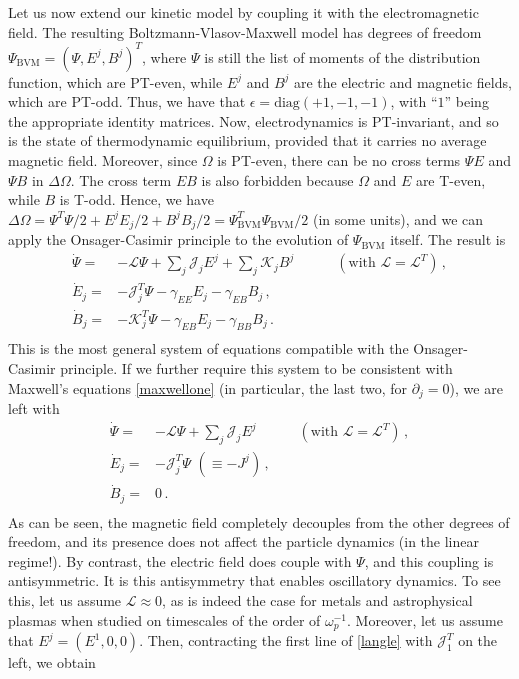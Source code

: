 \documentclass[a4paper, amsfonts, amssymb, amsmath, reprint, showkeys, nofootinbib, twoside,notitlepage,onecolumn]{revtex4-1}
\newcommand{\spc}{\quad \quad \quad}
\theoremstyle{definition}
\theoremstyle{theorem}
\begin{document}
Let us now extend our kinetic model by coupling it with the electromagnetic field. The resulting Boltzmann-Vlasov-Maxwell model has degrees of freedom $\Psi_{\text{BVM}}=(\Psi,E^j,B^j)^T$, where $\Psi$ is still the list of moments of the distribution function, which are PT-even, while $E^j$ and $B^j$ are the electric and magnetic fields, which are PT-odd. Thus, we have that $\epsilon=\text{diag}(+1,-1,-1)$, with ``$1$'' being the appropriate identity matrices. Now, electrodynamics is PT-invariant, and so is the state of thermodynamic equilibrium, provided that it carries no average magnetic field. Moreover, since $\Omega$ is PT-even, there can be no cross terms $\Psi E$ and $\Psi B$ in $\Delta \Omega$. The cross term $EB$ is also forbidden because $\Omega$ and $E$ are T-even, while $B$ is T-odd. Hence, we have $\Delta\Omega=\Psi^T \Psi/2+E^j E_j/2+B^j B_j/2=\Psi^T_{\text{BVM}}\Psi_{\text{BVM}}/2$ (in some units), and we can apply the Onsager-Casimir principle to the evolution of $\Psi_{\text{BVM}}$ itself. The result is
\newpage
\begin{equation}
\begin{split}
\Dot{\Psi}={}& -\mathcal{L}\Psi +{\sum}_j\mathcal{J}_j E^j +{\sum}_j \mathcal{K}_j B^j \spc (\text{with }\mathcal{L}=\mathcal{L}^T)\, , \\
\Dot{E}_j ={}&-\mathcal{J}_j^T\Psi -\gamma_{EE} E_j -\gamma_{EB}B_j \, , \\
\Dot{B}_j ={}&-\mathcal{K}_j^T\Psi -\gamma_{EB} E_j -\gamma_{BB}B_j \, . \\
\end{split}
\end{equation}
This is the most general system of equations compatible with the Onsager-Casimir principle. If we further require this system to be consistent with Maxwell's equations \eqref{maxwellone} (in particular, the last two, for $\partial_j=0$), we are left with
\begin{equation}\label{langle}
\begin{split}
\Dot{\Psi}={}& -\mathcal{L}\Psi +{\sum}_j\mathcal{J}_j E^j\spc (\text{with }\mathcal{L}=\mathcal{L}^T)\, , \\
\Dot{E}_j ={}&-\mathcal{J}_j^T\Psi\, \, (\equiv -J^j) \, , \\
\Dot{B}_j ={}& 0 \, . \\
\end{split}
\end{equation}
As can be seen, the magnetic field completely decouples from the other degrees of freedom, and its presence does not affect the particle dynamics (in the linear regime!). By contrast, the electric field does couple with $\Psi$, and this coupling is antisymmetric. It is this antisymmetry that enables oscillatory dynamics. To see this, let us assume $\mathcal{L}\approx 0$, as is indeed the case for metals and astrophysical plasmas when studied on timescales of the order of $\omega_p^{-1}$. Moreover, let us assume that $E^j=(E^1,0,0)$. Then, contracting the first line of \eqref{langle} with $\mathcal{J}^T_1$ on the left, we obtain
\end{document}
